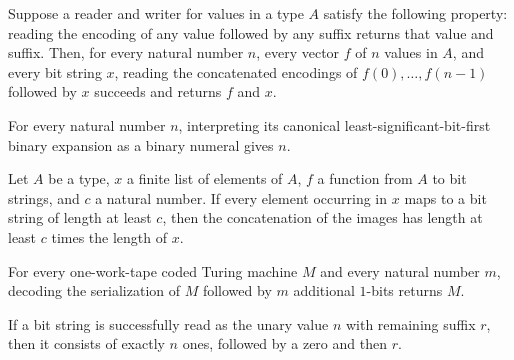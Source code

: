 \begin{lemma}
\label{Turing.codeReadVec_append}
\leanok
{}
Suppose a reader and writer for values in a type $A$ satisfy the following property:
reading the encoding of any value followed by any suffix returns that value and suffix.
Then, for every natural number $n$, every vector $f$ of $n$ values in $A$, and every bit
string $x$, reading the concatenated encodings of $f(0),\ldots,f(n-1)$ followed by $x$
succeeds and returns $f$ and $x$.
\end{lemma}

\begin{lemma}
\label{Turing.codeBitsNat_bits}
\leanok
{}
For every natural number $n$, interpreting its canonical least-significant-bit-first
binary expansion as a binary numeral gives $n$.
\end{lemma}

\begin{lemma}
\label{Turing.codeFlatMap_length}
\leanok
{}
Let $A$ be a type, $x$ a finite list of elements of $A$, $f$ a function from $A$ to bit
strings, and $c$ a natural number. If every element occurring in $x$ maps to a bit
string of length at least $c$, then the concatenation of the images has length at least
$c$ times the length of $x$.
\end{lemma}

\begin{lemma}
\label{Turing.codeDecode_serialize_pad}
\leanok
{}
For every one-work-tape coded Turing machine $M$ and every natural number $m$, decoding
the serialization of $M$ followed by $m$ additional $1$-bits returns $M$.
\end{lemma}

\begin{lemma}
\label{Turing.codeReadUnary_sound}
\leanok
{}
If a bit string is successfully read as the unary value $n$ with remaining suffix $r$,
then it consists of exactly $n$ ones, followed by a zero and then $r$.
\end{lemma}

